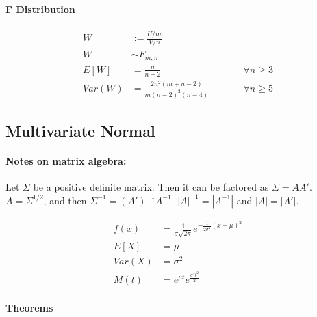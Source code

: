 \paragraph{F Distribution}

\begin{align*}
	W&:= \frac{U/m}{V/n} &	&\\
	W& \sim F_{m,n} &	&\\
	E[W]&=\frac{n}{n-2}&	&\qquad \forall n \geq 3\\
	Var(W) &= \frac{2n^2(m+n-2)}{m(n-2)^2(n-4)}  &	&\qquad \forall n \geq 5
\end{align*}

\subsection{Multivariate Normal}

\paragraph{Notes on matrix algebra:}
Let $\Sigma$ be a positive definite matrix. Then it can be factored as $\Sigma = AA'$. $A=\Sigma^{1/2}$, and then $\Sigma^{-1}=(A')^{-1}A^{-1}$.
$| A| ^{-1}=| A^{-1}| $ and $| A| =| A'| $.

\begin{align*}
	f(x) &= \frac{1}{\sigma \sqrt{2\pi}}e^{-\frac{1}{2\sigma^2}(x-\mu)^2 } \\
	E[X]&=\mu \\
	Var(X)&=\sigma^2  \\
	M(t)&=e^{\mu t}e^{\frac{\sigma^2 t^2}{2}}
\end{align*}

\paragraph{Theorems}

